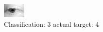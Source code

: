 \begin{figure}[h!]
\begin{center}
\includegraphics[width=0.60\columnwidth]{figures/ID2621_class_3_target_4.png}
\end{center}
\caption{ Classification: 3 actual target: 4}
\label{fig:ID2621_class_3_target_4}
\end{figure}
